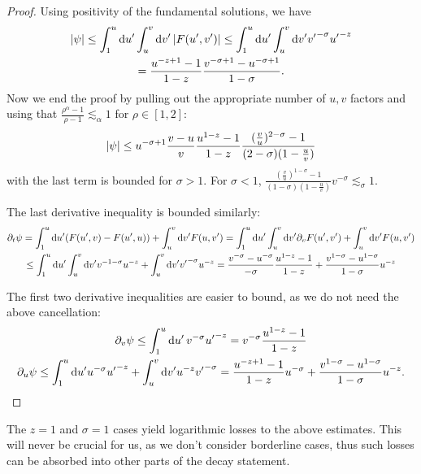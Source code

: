 \documentclass[11pt, oneside]{amsart}
\begin{document}
	\begin{proof}
		Using positivity of the fundamental solutions, we have
		\begin{equation*}
			\begin{gathered}
				\left\lvert \psi\right\rvert\leq \int_1^u\mathrm{d} u^\prime\int_u^v\mathrm{d} v^\prime  \left\lvert F(u^\prime,v^\prime)\right\rvert\leq \int_1^u\mathrm{d} u^\prime\int_u^v\mathrm{d} v^\prime {v^\prime}^{-\sigma}{u^\prime}^{-z}\\
				=\frac{u^{-z+1}-1}{1-z}\frac{v^{-\sigma+1}-u^{-\sigma+1}}{1-\sigma}.
			\end{gathered}
		\end{equation*}
		Now we end the proof by pulling out the appropriate number of $u,v$ factors and using that $\frac{\rho^\alpha-1}{\rho-1}\lesssim_\alpha1$ for $\rho\in[1,2]$:
		\begin{equation*}
			\begin{gathered}
				\left\lvert \psi\right\rvert\leq u^{-\sigma+1}\frac{v-u}{v}\frac{u^{1-z}-1}{1-z}\frac{(\frac{v}{u})^{2-\sigma}-1}{(2-\sigma)(1-\frac{u}{v})}
			\end{gathered}
		\end{equation*}
		with the last term is bounded for $\sigma>1$. For $\sigma<1$, $\frac{(\frac{v}{u})^{1-\sigma}-1}{(1-\sigma)(1-\frac{u}{v})}v^{-\sigma}\lesssim_\sigma1$.
		
		The last derivative inequality is bounded similarly:
		\begin{equation*}
			\begin{gathered}
				\partial_t\psi=\int_1^u\mathrm{d} u^\prime (F(u^\prime,v)-F(u^\prime,u))+\int_u^v\mathrm{d} v^\prime F(u,v^\prime)=\int_1^u\mathrm{d} u^\prime\int_u^v\mathrm{d} v^\prime \partial_vF(u^\prime,v^\prime)+\int_u^v\mathrm{d} v^\prime F(u,v^\prime)\\
				\leq \int_1^u\mathrm{d} u^\prime\int_u^v\mathrm{d} v^\prime v^{-1-\sigma}u^{-z}+\int_u^v\mathrm{d} v^\prime {v^\prime}^{-\sigma}u^{-z}=\frac{v^{-\sigma}-u^{-\sigma}}{-\sigma}\frac{u^{1-z}-1}{1-z}+\frac{v^{1-\sigma}-u^{1-\sigma}}{1-\sigma}u^{-z}
			\end{gathered}
		\end{equation*}
		
		The first two derivative inequalities are easier to bound, as we do not need the above cancellation:
		\begin{equation*}
			\begin{gathered}
				\partial_v\psi\leq\int_1^u\mathrm{d} u^\prime\, v^{-\sigma}{u^\prime}^{-z}=v^{-\sigma}\frac{u^{1-z}-1}{1-z}\\
				\partial_u\psi\leq \int_1^u \mathrm{d} u^\prime u^{-\sigma}{u^\prime}^{-z}+\int_u^v\mathrm{d} v^\prime u^{-z}{v^\prime}^{-\sigma}=\frac{u^{-z+1}-1}{1-z}u^{-\sigma}+\frac{v^{1-\sigma}-u^{1-\sigma}}{1-\sigma}u^{-z}.
			\end{gathered}
		\end{equation*}
	\end{proof}
	\begin{remark}
		The $z=1$ and $\sigma=1$ cases yield logarithmic losses to the above estimates. This will never be crucial for us, as we don't consider borderline cases, thus such losses can be absorbed into other parts of the decay statement.
	\end{remark}
	
\end{document}
